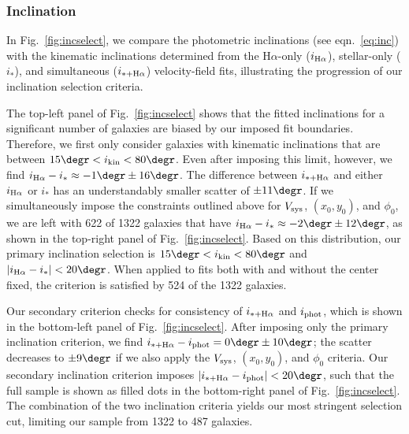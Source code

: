 \documentclass[apj,iop,revtex4,numberedappendix]{emulateapj}
\newcommand{\halpha}{H$\alpha$}
\begin{document}
\subsubsection{Inclination}

In Fig.~\ref{fig:incselect}, we compare the photometric inclinations
(see eqn.~\ref{eq:inc}) with the kinematic inclinations determined from
the \halpha-only ($i_{{\rm H}\alpha}$), stellar-only ($i_\ast$), and
simultaneous ($i_{\ast+{\rm H}\alpha}$) velocity-field fits,
illustrating the progression of our inclination selection criteria.

The top-left panel of Fig.~\ref{fig:incselect} shows that the fitted
inclinations for a significant number of galaxies are biased by our
imposed fit boundaries.  Therefore, we first only consider galaxies with
kinematic inclinations that are between $15\degr < i_{\rm kin} <
80\degr$.  Even after imposing this limit, however, we find $i_{{\rm
H}\alpha} - i_\ast \approx -1\degr\pm16\degr$.  The difference between
$i_{\ast+{\rm H}\alpha}$ and either $i_{{\rm H}\alpha}$ or $i_\ast$ has
an understandably smaller scatter of $\pm11\degr$.  If we simultaneously
impose the constraints outlined above for $V_{\rm sys}$, $(x_0,y_0)$,
and $\phi_0$, we are left with 622 of 1322 galaxies that have $i_{{\rm
H}\alpha} - i_\ast \approx -2\degr\pm12\degr$, as shown in the top-right
panel of Fig.~\ref{fig:incselect}.  Based on this distribution, our
primary inclination selection is $15\degr < i_{\rm kin} < 80\degr$ and
$|i_{{\rm H}\alpha} - i_\ast| < 20\degr$.  When applied to fits both
with and without the center fixed, the criterion is satisfied by 524 of
the 1322 galaxies.

Our secondary criterion checks for consistency of $i_{\ast+{\rm
H}\alpha}$ and $i_{\rm phot}$, which is shown in the bottom-left panel
of Fig.~\ref{fig:incselect}.  After imposing only the primary
inclination criterion, we find $i_{\ast+{\rm H}\alpha} - i_{\rm phot} =
0\degr\pm10\degr$; the scatter decreases to $\pm9\degr$ if we also apply
the $V_{\rm sys}$, $(x_0,y_0)$, and $\phi_0$ criteria.  Our secondary
inclination criterion imposes $|i_{\ast+{\rm H}\alpha} - i_{\rm phot}| <
20\degr$, such that the full sample is shown as filled dots in the
bottom-right panel of Fig.~\ref{fig:incselect}.  The combination of the
two inclination criteria yields our most stringent selection cut,
limiting our sample from 1322 to 487 galaxies.

\end{document}
